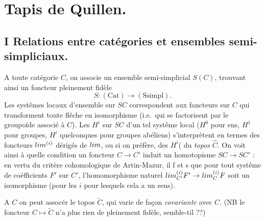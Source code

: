\documentclass[11pt,a4paper]{article}
\begin{document}


\section*{Tapis de Quillen.}

\subsection*{I \quad Relations entre catégories et ensembles semi-simpliciaux.}

A toute catégorie $C$, on associe un ensemble semi-simplicial $S(C)$,
trouvant ainsi un foncteur pleinement fidèle
\[
S : (\mathrm{Cat}) \longrightarrow (\mathrm{Ssimpl}) .
\]
Les systêmes locaux d'ensemble sur $SC$ correspondent aux fancteurs sur $C$
qui transforment toute flêche en isomorphisme (i.e.\ qui se factorisent par le
groupoïde associé à $C$). Les $H^{i}$ sur $SC$ d'un tel systême local ($H^{0}$
pour ens, $H^{1}$ pour groupes, $H^{i}$ quelconques pour groupes abéliens)
s'interprètent en termes des foncteurs $\varprojlim^{(i)}$ dérigés de
$\varprojlim$, ou si on préfère, des $H^{i}$( du \emph{topos} $\widehat{C}$. On voit
ainsi à quelle condition un foncteur $C \to C'$ induit un homotopisme $SC \to
SC'$ : en vertu du critère cohomologique de Artin-Mazur, il f et s que pour
tout systême de coéfficients $F'$ sur $C'$, l'homomorphisme naturel
$\varprojlim_{C'}^{(i)} F' \to \varprojlim_{C}^{(i)} F$ soit un isomorphisme
(pour les $i$ pour lesquels cela a un sens).

A $C$ on peut assocér le topos $\widetilde{C}$, qui varie de façon
\emph{covariante} avec $C$. (NB le foncteur $C \mapsto \widetilde{C}$ n'a plus
rien de pleinement fidèle, semble-til ??)
\end{document}
